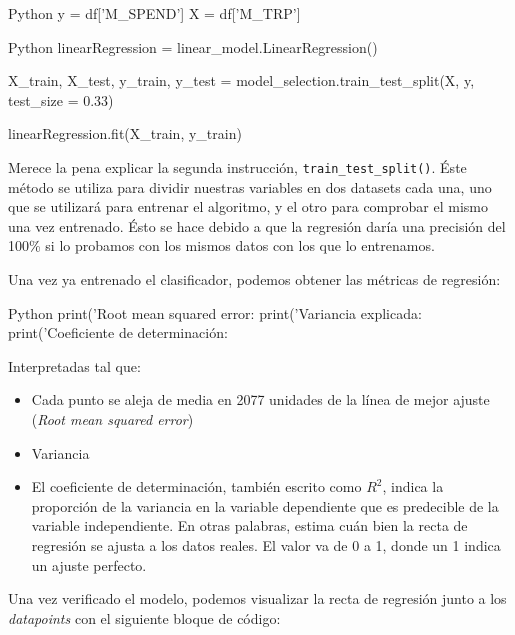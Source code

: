 \begin{TMcode}{Python}{}{}
y = df['M_SPEND']
X = df['M_TRP']
\end{TMcode}
\vspace{0.25cm}

\begin{TMcode}{Python}{}{}
linearRegression = linear_model.LinearRegression()

X_train, X_test, y_train, y_test = model_selection.train_test_split(X, y,
test_size = 0.33)

linearRegression.fit(X_train, y_train)
\end{TMcode}
\vspace{0.25cm}

Merece la pena explicar la segunda instrucción, \texttt{train\_test\_split()}.
Éste método se utiliza para dividir nuestras variables en dos datasets cada una,
uno que se utilizará para entrenar el algoritmo, y el otro para comprobar el
mismo una vez entrenado. Ésto se hace debido a que la regresión daría una
precisión del 100\% si lo probamos con los mismos datos con los que lo
entrenamos.

Una vez ya entrenado el clasificador, podemos obtener las métricas de regresión: 

\begin{TMcode}{Python}{}{}
print('Root mean squared error: %
print('Variancia explicada: %
print('Coeficiente de determinación: %
\end{TMcode}
\vspace{0.25cm}

Interpretadas tal que:

\begin{itemize}
\item Cada punto se aleja de media en 2077 unidades de la línea de mejor ajuste
  (\emph{Root mean squared error})
\item Variancia
\item El coeficiente de determinación, también escrito como $R^2$, indica la
  proporción de la variancia en la variable dependiente que es predecible de la
  variable independiente. En otras palabras, estima cuán bien la recta de
  regresión se ajusta a los datos reales. El valor va de 0 a 1, donde un 1
  indica un ajuste perfecto.
\end{itemize}

Una vez verificado el modelo, podemos visualizar la recta de regresión junto a
los \emph{datapoints} con el siguiente bloque de código:

